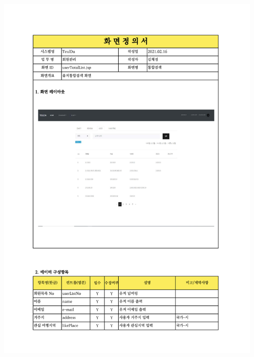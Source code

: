 {{{{{{{{{{{{{{{{{{{{{{{{{{{{{{{{{{{{{{{{{{{{{{{{{{{{{{{{{{{{{{{{{{{{{{{{{{{{{{{{{{\includegraphics[width=20cm]{./Figure/Design/Display/totalSearch/totalSearch_05.pdf} \\
}}}}}}}}}}}}}}}}}}}}}}}}}}}}}}}}}}}}}}}}}}}}}}}}}}}}}}}}}}}}}}}}}}}}}}}}}}}}}}}}}}
